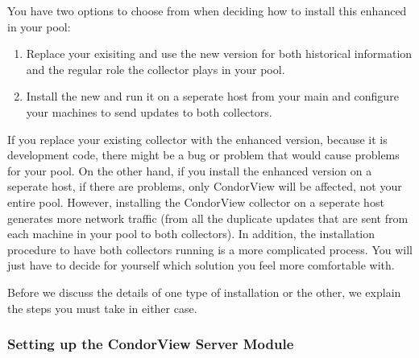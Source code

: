 You have two options to choose from when deciding how to install this
enhanced  in your pool:
\begin{enumerate}
\item Replace your exisiting  and use the new
version for both historical information and the regular role the 
collector plays in your pool.
\item Install the new  and run it on a seperate host
from your main  and configure your machines to send
updates to both collectors.
\end{enumerate}

If you replace your existing collector with the enhanced version,
because it is development code, there might be a bug or problem that
would cause problems for your pool.
On the other hand, if you install the enhanced version on a seperate
host, if there are problems, only CondorView will be affected, not
your entire pool.
However, installing the CondorView collector on a seperate host
generates more network traffic (from all the duplicate updates that
are sent from each machine in your pool to both collectors).
In addition, the installation procedure to have both collectors
running is a more complicated process.
You will just have to decide for yourself which solution you feel more
comfortable with.

Before we discuss the details of one type of installation or the
other, we explain the steps you must take in either case.

\subsubsection{\label{sec:CondorView-Server-Setup}
Setting up the CondorView Server Module} 

